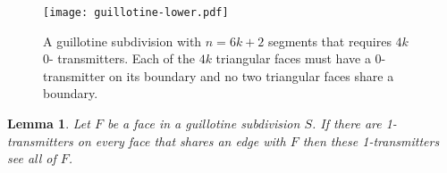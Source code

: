 \documentclass{article}
\newtheorem{lem}{Lemma}
\begin{document}
\begin{figure}
  \begin{center}
    \texttt{[image: guillotine-lower.pdf]}
  \end{center}
  \caption{A guillotine subdivision with $n=6k+2$ segments that requires $4k$ 0-           transmitters. Each of the $4k$ triangular faces must have a 0-transmitter on its boundary and no two triangular faces share a boundary.}
  \label{fig:guillotine-lower}
\end{figure}

\begin{lem}\label{lem:chop}
Let $F$ be a face in a guillotine subdivision $S$.  If there are
1-transmitters on every face that shares an edge with $F$ then these
1-transmitters see all of $F$.
\end{lem}
\end{document}

